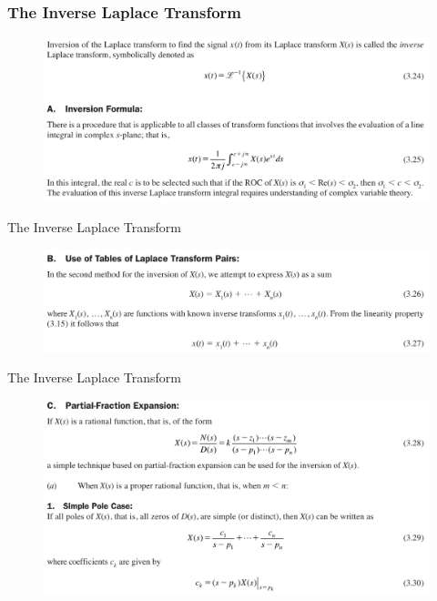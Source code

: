 \documentclass[pdflatex,compress,mathserif]{beamer}
\begin{document}
\begin{frame}
	\frametitle{The Inverse Laplace Transform}
	\begin{figure}
		\centering
		\includegraphics[width=\linewidth]{img/img28}
	\end{figure}
\end{frame}

\begin{frame}{The Inverse Laplace Transform}
	\begin{figure}
		\centering
		\includegraphics[width=\linewidth]{img/img29}
	\end{figure}
\end{frame}

\begin{frame}{The Inverse Laplace Transform}
	\begin{figure}
		\centering
		\includegraphics[width=\linewidth]{img/img30}
	\end{figure}
\end{frame}
\end{document}
